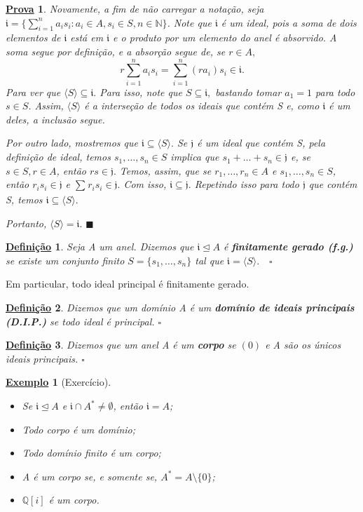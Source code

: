 \documentclass{article}
\newtheorem*{def*}{\underline{Defini\c c\~ao}}
\newtheorem{example}{\underline{Exemplo}}
\newtheorem*{proof*}{\underline{Prova}}
\renewcommand\qedsymbol{$\blacksquare$}
\begin{document}
\begin{proof*}
  Novamente, a fim de não carregar a notação, seja \(\mathfrak{i} = \{\sum\limits_{i=1}^{n}a_{i}s_{i}: a_{i}\in A, s_{i}\in S, n\in \mathbb{N}\}\). Note que
  \(\mathfrak{i}\) é um ideal, pois a soma de dois elementos de \(\mathfrak{i}\) está em \(\mathfrak{i}\) e o produto por um elemento do anel é absorvido.
  A soma segue por definição, e a absorção segue de, se \(r\in A,\) 
  \[
    r \sum\limits_{i=1}^{n}a_{i}s_{i} = \sum\limits_{i=1}^{n}(ra_{i})s_{i}\in \mathfrak{i}.
  \]
  Para ver que \(\langle S \rangle \subseteq{\mathfrak{i}}.\) Para isso, note que \(S\subseteq{\mathfrak{i}},\) bastando tomar \(a_{1} = 1\) para todo
  \(s\in S\). Assim, \(\langle S \rangle\) é a interseção de todos os ideais que contém S e, como \(\mathfrak{i}\) é um deles, a inclusão segue.

  Por outro lado, mostremos que \(\mathfrak{i}\subseteq{\langle S \rangle}.\) Se \(\mathfrak{j}\) é um ideal que contém S, pela definição de ideal, 
  temos \(s_{1}, \dotsc, s_{n}\in S\) implica que \(s_{1} + \dotsc + s_{n}\in \mathfrak{j}\) e, se \(s\in S, r\in A\), então \(rs\in \mathfrak{j}.\)
  Temos, assim, que se \(r_{1}, \dotsc, r_{n}\in A\) e \(s_{1}, \dotsc, s_{n}\in S\), então \(r_{i}s_{i}\in \mathfrak{j}\) e \(\sum\limits_{}^{}r_{i}s_{i}\in \mathfrak{j}.\)
  Com isso, \(\mathfrak{i}\subseteq{\mathfrak{j}}.\) Repetindo isso para todo \(\mathfrak{j}\) que contém S, temos \(\mathfrak{i}\subseteq{\langle S \rangle}.\)

  Portanto, \(\langle S \rangle = \mathfrak{i}.\) \qedsymbol
\end{proof*}
\begin{def*}
  Seja A um anel. Dizemos que \(\mathfrak{i} \trianglelefteq{A}\) é \textbf{finitamente gerado (f.g.)} se existe um conjunto finito
  \(S = \{s_{1}, \dotsc, s_{n}\}\) tal que \(\mathfrak{i} = \langle S \rangle.\quad\square\)
\end{def*}
Em particular, todo ideal principal é finitamente gerado.
\begin{def*}
  Dizemos que um domínio A é um \textbf{domínio de ideais principais (D.I.P.)} se todo ideal é principal. \(\square\)  
\end{def*}
\begin{def*}
  Dizemos que um anel A é um \textbf{corpo} se \((0)\) e A são os únicos ideais principais. \(\square\)
\end{def*}
\begin{example}[Exercício]
  \begin{itemize}
    \item[1)] Se \(\mathfrak{i}\trianglelefteq{A}\) e \(\mathfrak{i}\cap A^{*}\neq\emptyset\), então \(\mathfrak{i} = A\);
    \item[2)] Todo corpo é um domínio;
    \item[3)] Todo domínio finito é um corpo;
    \item[4)] A é um corpo se, e somente se, \(A^{*} = A \setminus{\{0\}}\);
    \item[5)] \(\mathbb{Q}[i]\) é um corpo.
  \end{itemize} 
\end{example}
\end{document}
